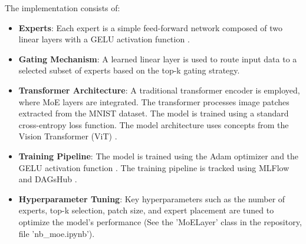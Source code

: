 \documentclass[a4paper,11pt]{article}
\begin{document}
The implementation consists of:
\begin{itemize}
    \item \textbf{Experts}: Each expert is a simple feed-forward network composed of two linear layers with a GELU activation function \cite{hendrycks2020gaussian}.
    \item \textbf{Gating Mechanism}: A learned linear layer is used to route input data to a selected subset of experts based on the top-k gating strategy.
    \item \textbf{Transformer Architecture}: A traditional transformer encoder is employed, where MoE layers are integrated. The transformer processes image patches extracted from the MNIST dataset. The model is trained using a standard cross-entropy loss function. The model architecture uses concepts from the Vision Transformer (ViT) \cite{dosovitskiy2020image}.
    \item \textbf{Training Pipeline}: The model is trained using the Adam optimizer \cite{kingma2014adam} and the GELU activation function \cite{hendrycks2016gaussian}. The training pipeline is tracked using MLFlow \cite{mlflow} and DAGsHub \cite{dagshub}.
    \item \textbf{Hyperparameter Tuning}: Key hyperparameters such as the number of experts, top-k selection, patch size, and expert placement are tuned to optimize the model's performance (See the 'MoELayer' class in the repository, file 'nb\_moe.ipynb').
\end{itemize}


\end{document}
